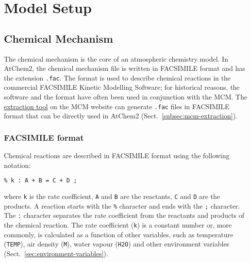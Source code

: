 %
%
%
%

\chapter{Model Setup} \label{ch:setup}

\section{Chemical Mechanism} \label{sec:chemical-mechanism}

The chemical mechanism is the core of an atmospheric chemistry
model. In AtChem2, the chemical mechanism file is written in FACSIMILE
format and has the extension \texttt{.fac}. The format is used to
describe chemical reactions in the commercial FACSIMILE Kinetic
Modelling Software; for historical reasons, the software and the
format have often been used in conjunction with the MCM. The
\href{http://mcm.york.ac.uk/extract.htt}{extraction tool} on the
MCM website can generate \texttt{.fac} files in FACSIMILE format that
can be directly used in AtChem2 (Sect.~\ref{subsec:mcm-extraction}).

\subsection{FACSIMILE format} \label{subsec:facsimile-format}

Chemical reactions are described in FACSIMILE format using the
following notation:

\begin{verbatim}
% k : A + B = C + D ;
\end{verbatim}

where \texttt{k} is the rate coefficient, \texttt{A} and \texttt{B}
are the reactants, \texttt{C} and \texttt{D} are the products. A
reaction starts with the \texttt{\%} character and ends with the
\texttt{;} character. The \texttt{:} character separates the rate
coefficient from the reactants and products of the chemical
reaction. The rate coefficient (\texttt{k}) is a constant number or, more
commonly, is calculated as a function of other variables, such as
temperature (\texttt{TEMP}), air density (\texttt{M}), water vapour
(\texttt{H2O}) and other environment variables
(Sect.~\ref{sec:environment-variables}).

